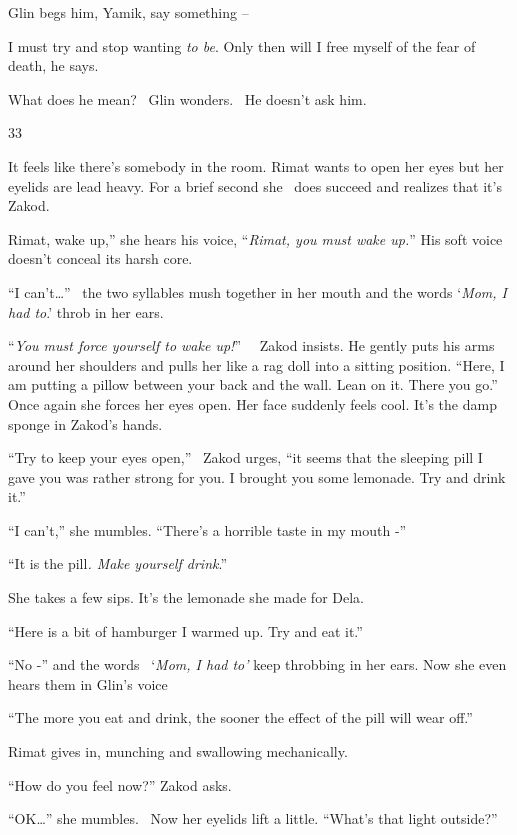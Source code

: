 \documentclass[letterpaper]{article}
\begin{document}
Glin begs him, {\textquotedbl}Yamik, say something --{\textquotedbl} 

{\textquotedbl}I must try and stop wanting \textit{to be}. Only then will I free myself of the fear of
death,{\textquotedbl} he says. 

What does he mean? \ Glin wonders. \ He doesn't ask him.


\bigskip

33 

It feels like there's somebody in the room. Rimat wants to open her eyes but her eyelids are lead heavy. For a brief
second she \ does succeed and realizes that it's Zakod.

{\textquotedbl}Rimat, wake up,'' she hears his voice, ``\textit{Rimat, you must wake up.}{}''\textit{ }His soft voice
doesn't conceal its harsh core. 

{}``I can't{\dots}'' \ the two syllables mush together in her mouth and the words `\textit{Mom, I had to}.' throb in her
ears.

{}``\textit{You must force yourself to wake up!}{}'' \textit{\ }\ Zakod insists. He gently puts his arms around her
shoulders and pulls her like a rag doll into a sitting position. ``Here, I am putting a pillow between your back and
the wall. Lean on it. There you go.'' Once again she forces her eyes open. Her face suddenly feels cool. It's the damp
sponge in Zakod's hands. 

{}``Try to keep your eyes open,'' \ Zakod urges, ``it seems that the sleeping pill I gave you was rather strong for you.
I brought you some lemonade. Try and drink it.''

{}``I can't,'' she mumbles. ``There's a horrible taste in my mouth -'' 

{}``It is the pill\textit{. Make yourself drink}.'' 

She takes a few sips. It's the lemonade she made for Dela.

{}``Here is a bit of hamburger I warmed up. Try and eat it.''

{}``No -'' and the words \ {}`\textit{Mom, I had to'} keep throbbing in her ears. Now she even hears them in Glin's
voice

{}``The more you eat and drink, the sooner the effect of the pill will wear off.''

Rimat gives in, munching and swallowing mechanically.

{}``How do you feel now?'' Zakod asks. 

{}``OK{\dots}'' she mumbles.~ Now her eyelids lift a little. ``What's that light outside?'' 
\end{document}

